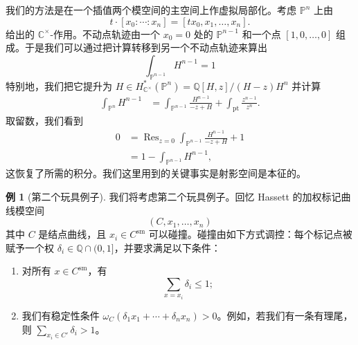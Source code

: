 \documentclass{amsart}
\theoremstyle{definition}
\newtheorem{exm}[thm]{例}
\theoremstyle{remark}
\theoremstyle{plain}
\theoremstyle{definition}
\theoremstyle{remark}
\newcommand{\C}{\mathbb{C}}
\newcommand{\Q}{\mathbb{Q}}
\renewcommand{\P}{\mathbb{P}}
\newcommand{\mr}[1]{\mathrm{#1}}
\newcommand{\on}[1]{\operatorname{#1}}
\newcommand{\1}{\mathbf{1}}
\newcommand{\2}{\mathbf{2}}
\newcommand{\3}{\mathbf{3}}
\begin{document}
我们的方法是在一个插值两个模空间的主空间上作虚拟局部化。考虑 \(\P^n\) 上由
\[ t \cdot [x_0 : \cdots : x_n] = [t x_0, x_1, \ldots, x_n]. \]
给出的 \(\C^{\times}\)-作用。不动点轨迹由一个 \(x_0 = 0\) 处的 \(\P^{n-1}\) 和一个点 \([1, 0, \ldots, 0]\) 组成。于是我们可以通过把计算转移到另一个不动点轨迹来算出
\[ \int_{\P^{n-1}} H^{n-1} = 1 \]
特别地，我们把它提升为 \(H \in H_{\C^{\times}}^* (\P^n) = \Q[H,z] / (H-z)H^n\) 并计算
\begin{align*}
    \int_{\P^n} H^{n-1} &= \int_{\P^{n-1}} \frac{H^{n-1}}{-z+H} + \int_{\mr{pt}} \frac{z^{n-1}}{z^n}.
\end{align*}
取留数，我们看到
\begin{align*}
    0 &= \on{Res}_{z = 0}\int_{\P^{n-1}} \frac{H^{n-1}}{-z+H} + 1 \\
    &= 1 - \int_{\P^{n-1}}H^{n-1},
\end{align*}
这恢复了所需的积分。我们这里用到的关键事实是射影空间是本征的。

\begin{exm}[第二个玩具例子]
    我们将考虑第二个玩具例子。回忆 Hassett 的加权标记曲线模空间
    \[ (C, x_1, \ldots, x_n) \]
    其中 \(C\) 是结点曲线，且 \(x_i \in C^{\mr{sm}}\) 可以碰撞。碰撞由如下方式调控：每个标记点被赋予一个权 \(\delta_i \in \Q \cap (0,1]\)，并要求满足以下条件：
    \begin{enumerate}
        \item 对所有 \(x \in C^{\mr{sm}}\)，有
            \[ \sum_{x = x_i} \delta_i \leq 1; \]
        \item 我们有稳定性条件 \(\omega_C(\delta_1 x_1 + \cdots + \delta_n x_n) > 0\)。例如，若我们有一条有理尾，则 \(\sum_{x_i \in C'} \delta_i > 1\)。
    \end{enumerate}
\end{exm}
\end{document}
